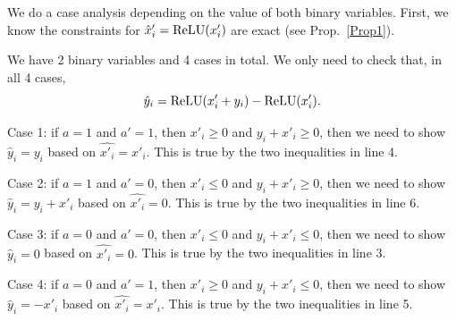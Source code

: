 We do a case analysis depending on the value of both binary variables. 
First, we know the constraints for $\hat{x}_i'=\mathrm{ReLU}(x_i')$ are exact (see 
Prop.~\ref{Prop1}). 

We have 2 binary variables and 4 cases in total. We only need to check that, in all 4 cases, $$\hat{y}_i = \mathrm{ReLU}(x'_i+y_i)-\mathrm{ReLU}(x'_i).$$

Case 1: if $a = 1$ and $a' = 1$, then $x'_i \geq 0 $ and $y_i+x'_i\geq 0$, then we need to show $\hat{y}_i = y_i$ based on  $\hat{x'_i} = x'_i$. This is true by the two inequalities in line 4.

Case 2: if $a = 1$ and $a' = 0$, then $x'_i \leq 0 $ and $y_i+x'_i\geq 0$, then we need to show $\hat{y}_i = y_i+x'_i$ based on  $\hat{x'_i} = 0$. This is true by the two inequalities in line 6.

Case 3: if $a = 0$ and $a' = 0$, then $x'_i \leq 0 $ and $y_i+x'_i\leq 0$, then we need to show $\hat{y}_i = 0$ based on  $\hat{x'_i} = 0$. This is true by the two inequalities in line 3.


Case 4: if $a = 0$ and $a' = 1$, then $x'_i \geq 0 $ and $y_i+x'_i\leq 0$, then we need to show $\hat{y}_i = -x'_i$ based on  $\hat{x'_i} = x'_i$. This is true by the two inequalities in line 5.

\fi


	
	
	



